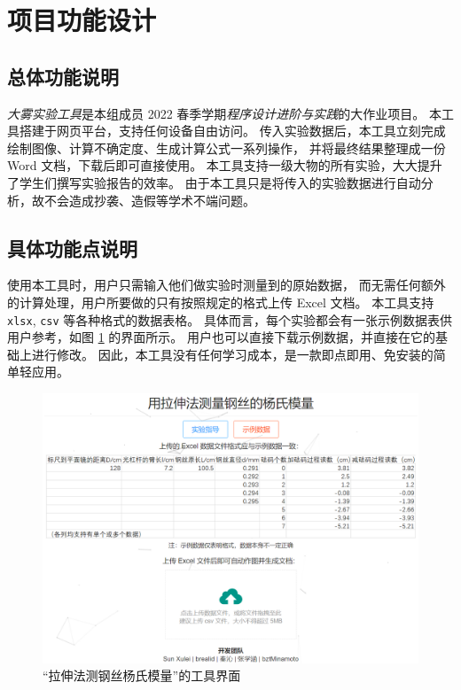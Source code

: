 \section{项目功能设计}

\subsection{总体功能说明}

\emph{大雾实验工具}是本组成员 2022 春季学期\textit{程序设计进阶与实践}的大作业项目。
本工具搭建于网页平台，支持任何设备自由访问。
传入实验数据后，本工具立刻完成绘制图像、计算不确定度、生成计算公式一系列操作，
并将最终结果整理成一份 Word 文档，下载后即可直接使用。
本工具支持一级大物的所有实验，大大提升了学生们撰写实验报告的效率。
由于本工具只是将传入的实验数据进行自动分析，故不会造成抄袭、造假等学术不端问题。

\subsection{具体功能点说明}

使用本工具时，用户只需输入他们做实验时测量到的原始数据，
而无需任何额外的计算处理，用户所要做的只有按照规定的格式上传 Excel 文档。
本工具支持 \verb|xlsx|, \verb|csv| 等各种格式的数据表格。
具体而言，每个实验都会有一张示例数据表供用户参考，如图 \ref{fig:interface} 的界面所示。
用户也可以直接下载示例数据，并直接在它的基础上进行修改。
因此，本工具没有任何学习成本，是一款即点即用、免安装的简单轻应用。

\begin{figure}[htbp]
  \centering
  \includegraphics[width=\columnwidth]{figure/interface.png}
  \caption{“拉伸法测钢丝杨氏模量”的工具界面}
  \label{fig:interface}
\end{figure}

